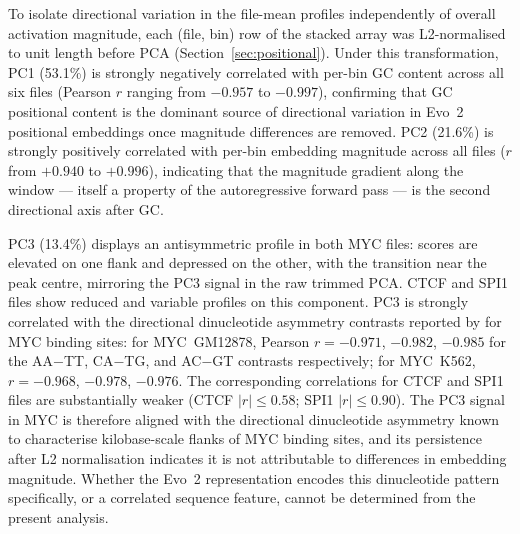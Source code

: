 To isolate directional variation in the file-mean profiles independently of overall activation magnitude, each (file, bin) row of the stacked array was L2-normalised to unit length before PCA (Section~\ref{sec:positional}).
Under this transformation, PC1 (53.1\%) is strongly negatively correlated with per-bin GC content across all six files (Pearson $r$ ranging from $-0.957$ to $-0.997$), confirming that GC positional content is the dominant source of directional variation in Evo~2 positional embeddings once magnitude differences are removed.
PC2 (21.6\%) is strongly positively correlated with per-bin embedding magnitude across all files ($r$ from $+0.940$ to $+0.996$), indicating that the magnitude gradient along the window — itself a property of the autoregressive forward pass — is the second directional axis after GC.

PC3 (13.4\%) displays an antisymmetric profile in both MYC files: scores are elevated on one flank and depressed on the other, with the transition near the peak centre, mirroring the PC3 signal in the raw trimmed PCA.
CTCF and SPI1 files show reduced and variable profiles on this component.
PC3 is strongly correlated with the directional dinucleotide asymmetry contrasts reported by \citet{faltejskovaNonconsensusFlankingSequence2026a} for MYC binding sites: for MYC~GM12878, Pearson $r = -0.971$, $-0.982$, $-0.985$ for the AA$-$TT, CA$-$TG, and AC$-$GT contrasts respectively; for MYC~K562, $r = -0.968$, $-0.978$, $-0.976$.
The corresponding correlations for CTCF and SPI1 files are substantially weaker (CTCF $|r| \leq 0.58$; SPI1 $|r| \leq 0.90$).
The PC3 signal in MYC is therefore aligned with the directional dinucleotide asymmetry known to characterise kilobase-scale flanks of MYC binding sites, and its persistence after L2 normalisation indicates it is not attributable to differences in embedding magnitude.
Whether the Evo~2 representation encodes this dinucleotide pattern specifically, or a correlated sequence feature, cannot be determined from the present analysis.

\shorthandon{-} 

